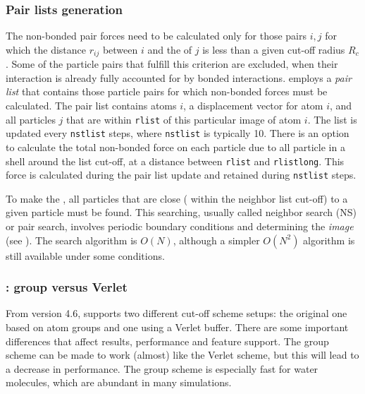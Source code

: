 \subsubsection{Pair lists generation}
The non-bonded pair forces need to be calculated only for those pairs
$i,j$  for which the distance $r_{ij}$ between $i$ and the 
of $j$ is less than a given cut-off radius $R_c$. Some of the particle
pairs that fulfill this criterion are excluded, when their interaction
is already fully accounted for by bonded interactions.  {\gromacs}
employs a {\em pair list} that contains those particle pairs for which
non-bonded forces must be calculated.  The pair list contains atoms
$i$, a displacement vector for atom $i$, and all particles $j$ that
are within \verb'rlist' of this particular image of atom $i$.  The
list is updated every \verb'nstlist' steps, where \verb'nstlist' is
typically 10. There is an option to calculate the total non-bonded
force on each particle due to all particle in a shell around the
list cut-off, {\ie} at a distance between \verb'rlist' and
\verb'rlistlong'.  This force is calculated during the pair list update
and  retained during \verb'nstlist' steps.

To make the , all particles that are close
({\ie} within the neighbor list cut-off) to a given particle must be found.
This searching, usually called neighbor search (NS) or pair search,
involves periodic boundary conditions and determining the {\em image}
(see ). The search algorithm is $O(N)$, although a simpler
$O(N^2)$ algorithm is still available under some conditions.

\subsubsection{: group versus Verlet}
From version 4.6, {\gromacs} supports two different cut-off scheme
setups: the original one based on atom groups and one using a Verlet
buffer. There are some important differences that affect results,
performance and feature support. The group scheme can be made to work
(almost) like the Verlet scheme, but this will lead to a decrease in
performance. The group scheme is especially fast for water molecules,
which are abundant in many simulations.

